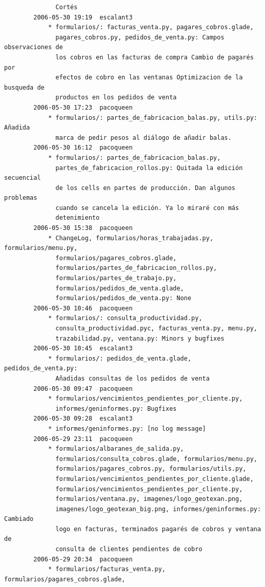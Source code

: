 \documentclass[a4paper]{article}
\begin{document}
\begin{verbatim}
              Cortés
        2006-05-30 19:19  escalant3
            * formularios/: facturas_venta.py, pagares_cobros.glade,
              pagares_cobros.py, pedidos_de_venta.py: Campos observaciones de
              los cobros en las facturas de compra Cambio de pagarés por
              efectos de cobro en las ventanas Optimizacion de la busqueda de
              productos en los pedidos de venta
        2006-05-30 17:23  pacoqueen
            * formularios/: partes_de_fabricacion_balas.py, utils.py: Añadida
              marca de pedir pesos al diálogo de añadir balas.
        2006-05-30 16:12  pacoqueen
            * formularios/: partes_de_fabricacion_balas.py,
              partes_de_fabricacion_rollos.py: Quitada la edición secuencial
              de los cells en partes de producción. Dan algunos problemas
              cuando se cancela la edición. Ya lo miraré con más
              detenimiento
        2006-05-30 15:38  pacoqueen
            * ChangeLog, formularios/horas_trabajadas.py, formularios/menu.py,
              formularios/pagares_cobros.glade,
              formularios/partes_de_fabricacion_rollos.py,
              formularios/partes_de_trabajo.py,
              formularios/pedidos_de_venta.glade,
              formularios/pedidos_de_venta.py: None
        2006-05-30 10:46  pacoqueen
            * formularios/: consulta_productividad.py,
              consulta_productividad.pyc, facturas_venta.py, menu.py,
              trazabilidad.py, ventana.py: Minors y bugfixes
        2006-05-30 10:45  escalant3
            * formularios/: pedidos_de_venta.glade, pedidos_de_venta.py:
              Añadidas consultas de los pedidos de venta
        2006-05-30 09:47  pacoqueen
            * formularios/vencimientos_pendientes_por_cliente.py,
              informes/geninformes.py: Bugfixes
        2006-05-30 09:28  escalant3
            * informes/geninformes.py: [no log message]
        2006-05-29 23:11  pacoqueen
            * formularios/albaranes_de_salida.py,
              formularios/consulta_cobros.glade, formularios/menu.py,
              formularios/pagares_cobros.py, formularios/utils.py,
              formularios/vencimientos_pendientes_por_cliente.glade,
              formularios/vencimientos_pendientes_por_cliente.py,
              formularios/ventana.py, imagenes/logo_geotexan.png,
              imagenes/logo_geotexan_big.png, informes/geninformes.py: Cambiado
              logo en facturas, terminados pagarés de cobros y ventana de
              consulta de clientes pendientes de cobro
        2006-05-29 20:34  pacoqueen
            * formularios/facturas_venta.py, formularios/pagares_cobros.glade,

\end{verbatim}
\end{document}
